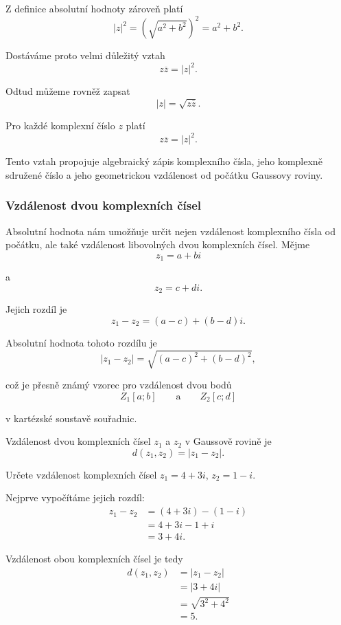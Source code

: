 \documentclass[12pt,a4paper]{article}
\begin{document}
Z definice absolutní hodnoty zároveň platí
\[
    |z|^2 = \left(\sqrt{a^2+b^2}\right)^2 = a^2+b^2.
\]

Dostáváme proto velmi důležitý vztah
\[
    z\overline{z} = |z|^2.
\]

Odtud můžeme rovněž zapsat
\[
    |z| = \sqrt{z\overline{z}}.
\]

\begin{notebox}
    Pro každé komplexní číslo $z$ platí
    \[
        z\overline{z}=|z|^2.
    \]

    Tento vztah propojuje algebraický zápis komplexního čísla, 
    jeho komplexně sdružené číslo a jeho geometrickou vzdálenost od počátku Gaussovy roviny.

\end{notebox}


\subsubsection*{Vzdálenost dvou komplexních čísel}
Absolutní hodnota nám umožňuje určit nejen vzdálenost komplexního čísla od počátku,
ale také vzdálenost libovolných dvou komplexních čísel.
Mějme
\[
    z_1=a+bi
\]

a
\[
    z_2=c+di.
\]

Jejich rozdíl je
\[
    z_1-z_2 = (a-c)+(b-d)i.
\]

Absolutní hodnota tohoto rozdílu je
\[
    |z_1-z_2| = \sqrt{(a-c)^2+(b-d)^2},
\]

což je přesně známý vzorec pro vzdálenost dvou bodů
\[
    Z_1[a;b] \qquad\text{a}\qquad Z_2[c;d]
\]

v kartézské soustavě souřadnic.

\begin{definitionbox}
    Vzdálenost dvou komplexních čísel $z_1$ a $z_2$ v Gaussově rovině je
    \[
        d(z_1,z_2)=|z_1-z_2|.
    \]
\end{definitionbox}

\begin{examplebox}
    Určete vzdálenost komplexních čísel $z_1=4+3i$, $z_2=1-i$.

    Nejprve vypočítáme jejich rozdíl:
    \begin{align*}
        z_1-z_2 &= (4+3i)-(1-i) \\
                &= 4+3i-1+i \\
                &= 3+4i.
    \end{align*}

    Vzdálenost obou komplexních čísel je tedy
    \begin{align*}
        d(z_1,z_2)  &= |z_1-z_2| \\
                    &= |3+4i| \\
                    &= \sqrt{3^2+4^2} \\
                    &= 5.
    \end{align*}
\end{examplebox}
\end{document}
